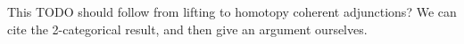 This TODO should follow from lifting to homotopy coherent adjunctions?
We can cite the 2-categorical result, and then give an argument ourselves.
